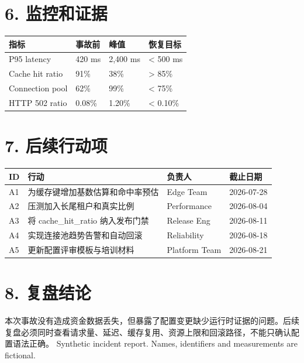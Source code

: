\documentclass[10pt,a4paper]{article}
\begin{document}
\section*{6. 监控和证据}
\begin{tabular}{p{45mm}p{34mm}p{32mm}p{38mm}}
\toprule
指标 & 事故前 & 峰值 & 恢复目标\\\midrule
P95 latency & 420 ms & 2,400 ms & < 500 ms\\
Cache hit ratio & 91\% & 38\% & > 85\%\\
Connection pool & 62\% & 99\% & < 75\%\\
HTTP 502 ratio & 0.08\% & 1.20\% & < 0.10\%\\
\bottomrule
\end{tabular}
\section*{7. 后续行动项}
\begin{longtable}{p{10mm}p{78mm}p{35mm}p{25mm}}
\toprule ID & 行动 & 负责人 & 截止日期\\\midrule
A1 & 为缓存键增加基数估算和命中率预估 & Edge Team & 2026-07-28\\
A2 & 压测加入长尾租户和真实比例 & Performance & 2026-08-04\\
A3 & 将 cache\_hit\_ratio 纳入发布门禁 & Release Eng & 2026-08-11\\
A4 & 实现连接池趋势告警和自动回滚 & Reliability & 2026-08-18\\
A5 & 更新配置评审模板与培训材料 & Platform Team & 2026-08-21\\
\bottomrule
\end{longtable}
\section*{8. 复盘结论}
本次事故没有造成资金数据丢失，但暴露了配置变更缺少运行时证据的问题。后续复盘必须同时查看请求量、延迟、缓存复用、资源上限和回滚路径，不能只确认配置语法正确。
\vfill\color{muted}\small Synthetic incident report. Names, identifiers and measurements are fictional.
\end{document}
